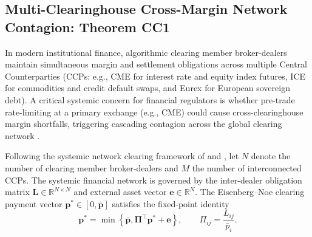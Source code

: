 \documentclass[10pt,twocolumn,letterpaper]{article}
\theoremstyle{definition}
\theoremstyle{remark}
\begin{document}
\subsection{Multi-Clearinghouse Cross-Margin Network Contagion: Theorem CC1}
\label{sec:clearinghouse_network_contagion}
In modern institutional finance, algorithmic clearing member broker-dealers maintain simultaneous margin and settlement obligations across multiple Central Counterparties (CCPs: e.g., CME for interest rate and equity index futures, ICE for commodities and credit default swaps, and Eurex for European sovereign debt). A critical systemic concern for financial regulators is whether pre-trade rate-limiting at a primary exchange (e.g., CME) could cause cross-clearinghouse margin shortfalls, triggering cascading contagion across the global clearing network \citep{eisenberg2001systemic,glasserman2015likely}.

Following the systemic network clearing framework of \citet{eisenberg2001systemic} and \citet{glasserman2015likely}, let $N$ denote the number of clearing member broker-dealers and $M$ the number of interconnected CCPs. The systemic financial network is governed by the inter-dealer obligation matrix $\mathbf{L} \in \mathbb{R}^{N \times N}$ and external asset vector $\mathbf{e} \in \mathbb{R}^N$. The Eisenberg--Noe clearing payment vector $\mathbf{p}^* \in [0, \bar{\mathbf{p}}]$ satisfies the fixed-point identity
\begin{equation}
\mathbf{p}^* = \min \left\{ \bar{\mathbf{p}}, \mathbf{\Pi}^\top \mathbf{p}^* + \mathbf{e} \right\}, \qquad \Pi_{ij} = \frac{L_{ij}}{\bar{p}_i}.
\end{equation}
\end{document}
